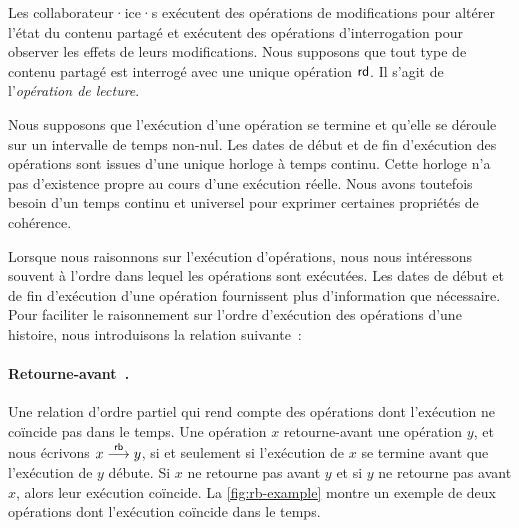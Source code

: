 Les collaborateur·ice·s exécutent des opérations de modifications pour altérer l'état du contenu partagé et exécutent des opérations d'interrogation pour observer les effets de leurs modifications.
Nous supposons que tout type de contenu partagé est interrogé avec une unique opération $\operatorname{\mathsf{rd}}$.
Il s'agit de l'\emph{opération de lecture}.

Nous supposons que l'exécution d'une opération se termine et qu'elle se déroule sur un intervalle de temps non-nul.
Les dates de début et de fin d'exécution des opérations sont issues d'une unique horloge à temps continu.
Cette horloge n'a pas d'existence propre au cours d'une exécution réelle.
Nous avons toutefois besoin d'un temps continu et universel pour exprimer certaines propriétés de cohérence.

Lorsque nous raisonnons sur l'exécution d'opérations, nous nous intéressons souvent à l'ordre dans lequel les opérations sont exécutées.
Les dates de début et de fin d'exécution d'une opération fournissent plus d'information que nécessaire.
Pour faciliter le raisonnement sur l'ordre d'exécution des opérations d'une histoire, nous introduisons la relation suivante~:

\paragraph{Retourne-avant~\autocite{burckhardt_eventualconsistency_2014}.} Une relation d'ordre partiel qui rend compte des opérations dont l'exécution ne coïncide pas dans le temps.
Une opération $x$ retourne-avant une opération $y$, et nous écrivons $x \overset{\mathsf{rb}}{\longrightarrow} y$, si et seulement si l'exécution de $x$ se termine avant que l'exécution de $y$ débute.
Si $x$ ne retourne pas avant $y$ et si $y$ ne retourne pas avant $x$, alors leur exécution coïncide.
La \autoref{fig:rb-example} montre un exemple de deux opérations dont l'exécution coïncide dans le temps.


